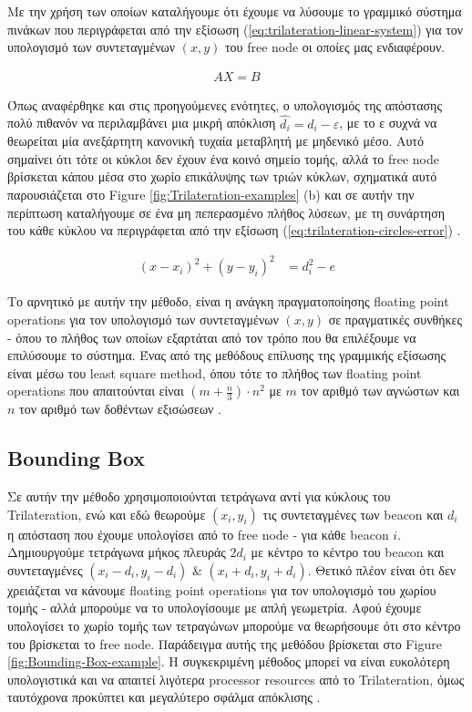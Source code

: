 Με την χρήση των οποίων καταλήγουμε ότι έχουμε να λύσουμε το γραμμικό σύστημα πινάκων που περιγράφεται από την εξίσωση (\ref{eq:trilateration-linear-system}) για τον
υπολογισμό των συντεταγμένων $(x,y)$ του free node οι οποίες μας ενδιαφέρουν.

\begin{align}
	AX = B \label{eq:trilateration-linear-system}
\end{align}

Όπως αναφέρθηκε και στις προηγούμενες ενότητες, ο υπολογισμός της απόστασης πολύ πιθανόν να περιλαμβάνει μια μικρή απόκλιση $\widehat{d_i} = d_i - ε$, 
με το ε συχνά να θεωρείται μία ανεξάρτητη κανονική τυχαία μεταβλητή με μηδενικό μέσο. Αυτό σημαίνει ότι
τότε οι κύκλοι δεν έχουν ένα κοινό σημείο τομής, αλλά το free node βρίσκεται κάπου μέσα στο χωρίο επικάλυψης
των τριών κύκλων, σχηματικά αυτό παρουσιάζεται στο Figure \ref{fig:Trilateration-examples} (b) και σε αυτήν την περίπτωση καταλήγουμε σε ένα
μη πεπερασμένο πλήθος λύσεων, με τη συνάρτηση του κάθε κύκλου να περιγράφεται από την εξίσωση
(\ref{eq:trilateration-circles-error}) \cite{wsn-Localization-systems}.

\begin{align}
	(x-x_i)^2 + (y-y_i)^2 &= d_i^2-e \label{eq:trilateration-circles-error}
\end{align}

Το αρνητικό με αυτήν την μέθοδο, είναι η ανάγκη πραγματοποίησης floating point operations για τον υπολογισμό των συντεταγμένων $(x,y)$ σε πραγματικές συνθήκες - όπου το πλήθος
των οποίων εξαρτάται από τον τρόπο που θα επιλέξουμε να επιλύσουμε το σύστημα. 
Ένας από της μεθόδους επίλυσης της γραμμικής εξίσωσης είναι μέσω του least square method, όπου τότε το πλήθος των floating point operations
που απαιτούνται είναι $(m+\frac{n}{3})\cdot n^2$ με $m$ τον αριθμό των αγνώστων και $n$ τον αριθμό των δοθέντων εξισώσεων \cite{wsn-Localization-systems}.

\subsection{Bounding Box}
Σε αυτήν την μέθοδο χρησιμοποιούνται τετράγωνα αντί για κύκλους του Trilateration, ενώ και εδώ θεωρούμε $(x_i,y_i)$
τις συντεταγμένες των beacon και $d_i$ η απόσταση που έχουμε υπολογίσει από το free node - για κάθε beacon $i$. Δημιουργούμε
τετράγωνα μήκος πλευράς $2d_i$ με κέντρο το κέντρο του beacon και συντεταγμένες $(x_i - d_i, y_i - d_i)$ \& $(x_i + d_i, y_i + d_i)$. 
Θετικό πλέον είναι ότι δεν χρειάζεται να κάνουμε floating point operations για τον υπολογισμό του χωρίου τομής - αλλά μπορούμε να το υπολογίσουμε
με απλή γεωμετρία. Αφού έχουμε υπολογίσει το χωρίο τομής των τετραγώνων μπορούμε να θεωρήσουμε ότι στο κέντρο του βρίσκεται το free node.
Παράδειγμα αυτής της μεθόδου βρίσκεται στο Figure \ref{fig:Bounding-Box-example}.
Η συγκεκριμένη μέθοδος μπορεί να είναι ευκολότερη υπολογιστικά και να απαιτεί λιγότερα processor resources από το Trilateration, όμως ταυτόχρονα 
προκύπτει και μεγαλύτερο σφάλμα απόκλισης \cite{wsn-Localization-systems}.   


